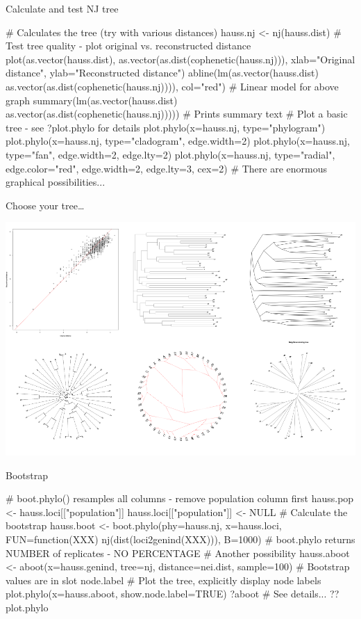\documentclass[compress, ucs, xelatex, 11pt, xcolor=svgnames,
  hyperref={
    bookmarks=true,
    unicode=true,
    colorlinks=true,
    pdftitle={Molecular data in R},
    plainpages=false,
    pdfauthor={Vojtech Zeisek},
    pdfsubject={Course about phylogeny and evolution in R},
    pdfcreator={XeLaTeX},
    pdfkeywords={R, evolution, phylogeny, molecular data},
    linkcolor=Tomato,
    anchorcolor=SaddleBrown,
    citecolor=Goldenrod,
    filecolor=DarkMagenta,
    menucolor=Sienna,
    urlcolor=DarkTurquoise,
    pdftex},
  url={hyphens, lowtilde} %
  ]{beamer}
\begin{document}
\begin{frame}[fragile]{Calculate and test NJ tree}
  \begin{spluscode}
    # Calculates the tree (try with various distances)
    hauss.nj <- nj(hauss.dist)
    # Test tree quality - plot original vs. reconstructed distance
    plot(as.vector(hauss.dist), as.vector(as.dist(cophenetic(hauss.nj))),
      xlab="Original distance", ylab="Reconstructed distance")
    abline(lm(as.vector(hauss.dist) ~
      as.vector(as.dist(cophenetic(hauss.nj)))), col="red")
    # Linear model for above graph
    summary(lm(as.vector(hauss.dist) ~
      as.vector(as.dist(cophenetic(hauss.nj))))) # Prints summary text
    # Plot a basic tree - see ?plot.phylo for details
    plot.phylo(x=hauss.nj, type="phylogram")
    plot.phylo(x=hauss.nj, type="cladogram", edge.width=2)
    plot.phylo(x=hauss.nj, type="fan", edge.width=2, edge.lty=2)
    plot.phylo(x=hauss.nj, type="radial", edge.color="red",
      edge.width=2, edge.lty=3, cex=2)
    # There are enormous graphical possibilities...
  \end{spluscode}
\end{frame}

\begin{frame}{Choose your tree\ldots}
  \begin{center}
    \includegraphics[width=\textwidth-1.5cm]{nj1.png}
  \end{center}
\end{frame}

\begin{frame}[fragile]{Bootstrap}
  \begin{spluscode}
    # boot.phylo() resamples all columns - remove population column first
    hauss.pop <- hauss.loci[["population"]]
    hauss.loci[["population"]] <- NULL
    # Calculate the bootstrap
    hauss.boot <- boot.phylo(phy=hauss.nj, x=hauss.loci,
      FUN=function(XXX) nj(dist(loci2genind(XXX))), B=1000)
    # boot.phylo returns NUMBER of replicates - NO PERCENTAGE
    # Another possibility
    hauss.aboot <- aboot(x=hauss.genind, tree=nj, distance=nei.dist,
      sample=100) # Bootstrap values are in slot node.label
    # Plot the tree, explicitly display node labels
    plot.phylo(x=hauss.aboot, show.node.label=TRUE)
    ?aboot # See details...
    ??plot.phylo
  \end{spluscode}
\end{frame}
\end{document}
